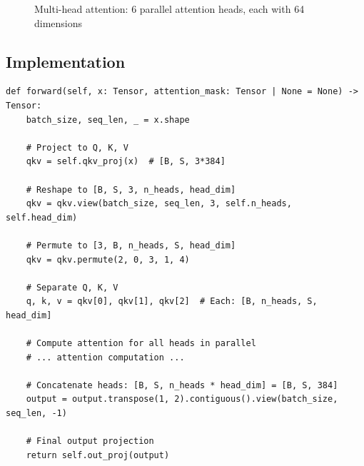 \begin{figure}[H]
\centering
{}
\caption{Multi-head attention: 6 parallel attention heads, each with 64 dimensions}
\label{fig:multi-head}
\end{figure}

\subsection{Implementation}

\begin{lstlisting}[style=python, caption={Multi-head attention reshape from model.py}]
def forward(self, x: Tensor, attention_mask: Tensor | None = None) -> Tensor:
    batch_size, seq_len, _ = x.shape

    # Project to Q, K, V
    qkv = self.qkv_proj(x)  # [B, S, 3*384]

    # Reshape to [B, S, 3, n_heads, head_dim]
    qkv = qkv.view(batch_size, seq_len, 3, self.n_heads, self.head_dim)

    # Permute to [3, B, n_heads, S, head_dim]
    qkv = qkv.permute(2, 0, 3, 1, 4)

    # Separate Q, K, V
    q, k, v = qkv[0], qkv[1], qkv[2]  # Each: [B, n_heads, S, head_dim]

    # Compute attention for all heads in parallel
    # ... attention computation ...

    # Concatenate heads: [B, S, n_heads * head_dim] = [B, S, 384]
    output = output.transpose(1, 2).contiguous().view(batch_size, seq_len, -1)

    # Final output projection
    return self.out_proj(output)
\end{lstlisting}

